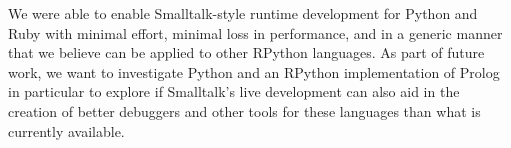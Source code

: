 \documentclass[10pt,numbers]{sigplanconf}
\begin{document}
We were able to enable Smalltalk-style runtime development for Python and Ruby
with minimal effort, minimal loss in performance, and in a generic manner that
we believe can be applied to other RPython languages. As part of future work, we
want to investigate Python and an RPython implementation of Prolog in particular
to explore if Smalltalk's live development can also aid in the creation of
better debuggers and other tools for these languages than what is currently
available.










\end{document}
